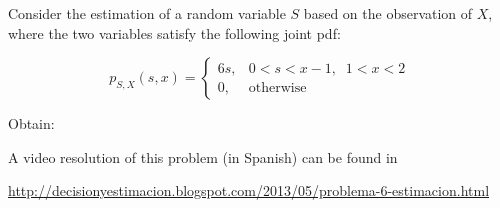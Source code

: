 \else

\question Consider the estimation of a random variable $S$ based on the observation of $X$, where the two variables satisfy the following joint pdf:

$$p_{S,X}(s,x)= \left\lbrace  \begin{array}{ll} 6s, & 0<s<x-1, \; \; 1<x<2 \\
0, & \mbox{otherwise}  \end{array}  \right. $$

Obtain:

 \begin{solution}
 
 A video resolution of this problem (in Spanish) can be found in
 
\url{http://decisionyestimacion.blogspot.com/2013/05/problema-6-estimacion.html}

 \end{solution}

\fi